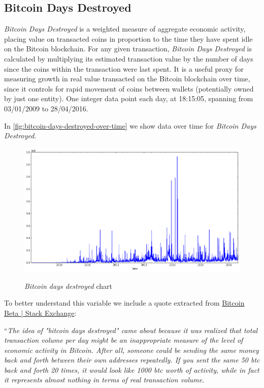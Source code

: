 
\subsection{Bitcoin Days Destroyed}
\label{sec:bitcoin-days-destroyed}

\textit{Bitcoin Days Destroyed} is a weighted measure of aggregate
economic activity, placing value on transacted coins in proportion to
the time they have spent idle on the Bitcoin blockchain. For any given
transaction, \textit{Bitcoin Days Destroyed} is calculated by
multiplying its estimated transaction value by the number of days
since the coins within the transaction were last spent. It is a useful
proxy for measuring growth in real value transacted on the Bitcoin
blockchain over time, since it controls for rapid movement of coins
between wallets (potentially owned by just one entity). One integer
data point each day, at 18:15:05, spanning from 03/01/2009 to
28/04/2016.

In \autoref{fig:bitcoin-days-destroyed-over-time} we show data over
time for \textit{Bitcoin Days Destroyed}.

\begin{figure}[bth]
  \myfloatalign
  {\includegraphics[width=1\linewidth]
    {gfx/bitcoin-days-destroyed-over-time}}
  \caption{\textit{Bitcoin days destroyed} chart}
  \label{fig:bitcoin-days-destroyed-over-time}
\end{figure}

To better understand this variable we include a quote extracted from
\href{http://bitcoin.stackexchange.com/questions/845/what-are-bitcoin-days-destroyed}{Bitcoin
  Beta | Stack Exchange}:

``\textit{The idea of "bitcoin days destroyed" came about because it
  was realized that total transaction volume per day might be an
  inappropriate measure of the level of economic activity in Bitcoin.
  After all, someone could be sending the same money back and forth
  between their own addresses repeatedly. If you sent the same 50 btc
  back and forth 20 times, it would look like 1000 btc worth of
  activity, while in fact it represents almost nothing in terms of
  real transaction volume.}


